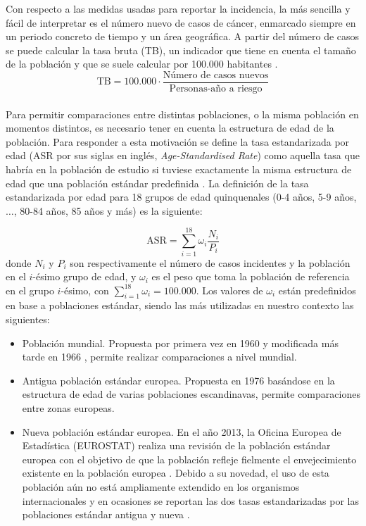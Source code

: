 Con respecto a las medidas usadas para reportar la incidencia, la más sencilla y fácil de interpretar es el número nuevo de casos de cáncer, enmarcado siempre en un periodo concreto de tiempo y un área geográfica. A partir del número de casos se puede calcular la tasa bruta (TB), un indicador que tiene en cuenta el tamaño de la población y que se suele calcular por 100.000 habitantes \cite{IARC1995}.\\

$$\text{TB}  = 100.000 \cdot \dfrac{\text{Número de casos nuevos}}{\text{Personas-año a riesgo}}$$\\

Para permitir comparaciones entre distintas poblaciones, o la misma población en momentos distintos, es necesario tener en cuenta la estructura de edad de la población. Para responder a esta motivación se define la tasa estandarizada por edad (ASR por sus siglas en inglés, \textit{Age-Standardised Rate}) como aquella tasa que habría en la población de estudio si tuviese exactamente la misma estructura de edad que una población estándar predefinida \cite{IARC1995}. La definición de la tasa estandarizada por edad para 18 grupos de edad quinquenales (0-4 años, 5-9 años, $\dots$, 80-84 años, 85 años y más) es la siguiente:

$$\text{ASR} = \sum_{i = 1}^{18} \omega_i \dfrac{N_i}{P_i} $$
donde $N_i$ y $P_i$ son respectivamente el número de casos incidentes y la población en el $i$-ésimo grupo de edad, y $\omega_i$ es el peso que toma la población de referencia en el grupo $i$-ésimo, con $\sum_{i = 1}^{18}\omega_i = 100.000$. Los valores de ${\omega_i}$ están predefinidos en base a poblaciones estándar, siendo las más utilizadas en nuestro contexto las siguientes:

\begin{itemize}
	
	\item Población mundial. Propuesta por primera vez en 1960 \cite{SegiM.1960} y modificada más tarde en 1966 \cite{Doll1966}, permite realizar comparaciones a nivel mundial.
		
	\item Antigua población estándar europea. Propuesta en 1976 \cite{Waterhouse1976} basándose en la estructura de edad de varias poblaciones escandinavas, permite comparaciones entre zonas europeas.
	
	\item Nueva población estándar europea. En el año 2013, la Oficina Europea de Estadística (EUROSTAT) realiza una revisión de la población estándar europea con el objetivo de que la población refleje fielmente el envejecimiento existente en la población europea \cite{EUROSTAT2013}. Debido a su novedad, el uso de esta población aún no está ampliamente extendido en los organismos internacionales \cite{ECIS2} y en ocasiones se reportan las dos tasas estandarizadas por las poblaciones estándar antigua y nueva \cite{ECIS}.
	

\end{itemize}

